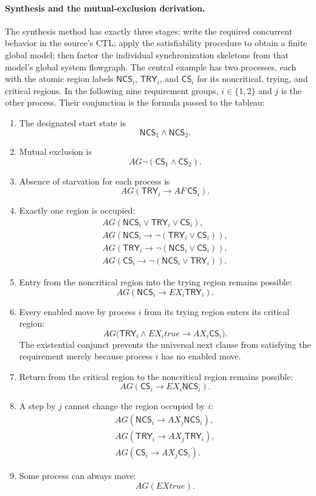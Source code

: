 \paragraph{Synthesis and the mutual-exclusion derivation.}
The synthesis method has exactly three stages: write the required concurrent
behavior in the source's CTL; apply the satisfiability procedure to obtain a
finite global model; then factor the individual synchronization skeletons
from that model's global system flowgraph.  The central example has two
processes, each with the atomic region labels
\(\mathsf{NCS}_i\), \(\mathsf{TRY}_i\), and \(\mathsf{CS}_i\) for its
noncritical, trying, and critical regions.  In the following nine requirement
groups, \(i\in\{1,2\}\) and \(j\) is the other process.  Their conjunction is
the formula passed to the tableau:
\begin{enumerate}
\item The designated start state is
\[
 \mathsf{NCS}_1\land\mathsf{NCS}_2.
\]
\item Mutual exclusion is
\[
 AG\neg(\mathsf{CS}_1\land\mathsf{CS}_2).
\]
\item Absence of starvation for each process is
\[
 AG(\mathsf{TRY}_i\to AF\,\mathsf{CS}_i).
\]
\item Exactly one region is occupied:
\[
\begin{gathered}
 AG(\mathsf{NCS}_i\lor\mathsf{TRY}_i\lor\mathsf{CS}_i),\\
 AG(\mathsf{NCS}_i\to
     \neg(\mathsf{TRY}_i\lor\mathsf{CS}_i)),\\
 AG(\mathsf{TRY}_i\to
     \neg(\mathsf{NCS}_i\lor\mathsf{CS}_i)),\\
 AG(\mathsf{CS}_i\to
     \neg(\mathsf{NCS}_i\lor\mathsf{TRY}_i)).
\end{gathered}
\]
\item Entry from the noncritical region into the trying region remains
possible:
\[
 AG(\mathsf{NCS}_i\to EX_i\mathsf{TRY}_i).
\]
\item Every enabled move by process \(i\) from its trying region enters its
critical region:
\[
 AG\bigl(
   \mathsf{TRY}_i\land EX_i\mathit{true}
   \to AX_i\mathsf{CS}_i
 \bigr).
\]
The existential conjunct prevents the universal next clause from satisfying
the requirement merely because process \(i\) has no enabled move.
\item Return from the critical region to the noncritical region remains
possible:
\[
 AG(\mathsf{CS}_i\to EX_i\mathsf{NCS}_i).
\]
\item A step by \(j\) cannot change the region occupied by \(i\):
\[
\begin{gathered}
 AG(\mathsf{NCS}_i\to AX_j\mathsf{NCS}_i),\\
 AG(\mathsf{TRY}_i\to AX_j\mathsf{TRY}_i),\\
 AG(\mathsf{CS}_i\to AX_j\mathsf{CS}_i).
\end{gathered}
\]
\item Some process can always move:
\[
 AG(EX\mathit{true}).
\]
\end{enumerate}

